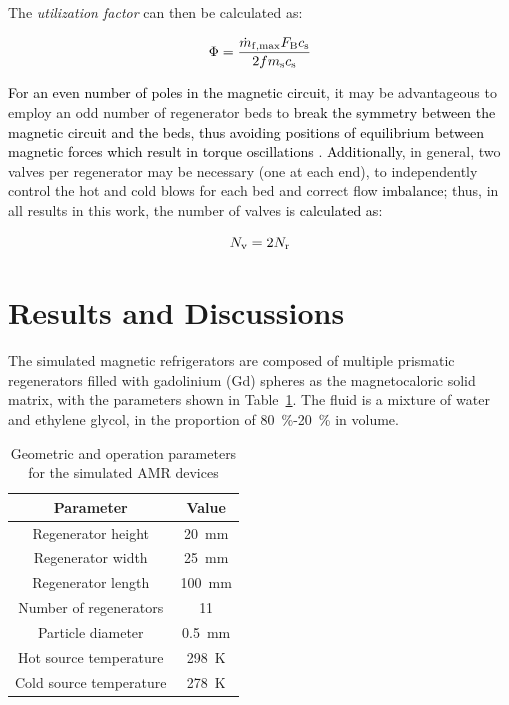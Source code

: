 \documentclass[draft]{svjour3}
\begin{document}
The \emph{utilization factor} can then be calculated as:

\begin{equation}
  \label{eq:110}
  \Phi = \frac{\dot{m}_{\mathrm{f,max}} F_{\mathrm{B}} c_{\mathrm{s}}}{2 f m_{\mathrm{s}} c_{\mathrm{s}}}
\end{equation}


\textcolor{black}{For an even number of poles in the magnetic circuit}, it may be advantageous to employ an odd number of regenerator beds to  \textcolor{black}{break the symmetry between the magnetic circuit and the beds, thus avoiding positions of equilibrium between magnetic forces which result in torque oscillations} \cite{bib:eriksen}. \textcolor{black}{Additionally}, in general, two valves per regenerator  may be necessary (one at each end), to independently control  the hot and cold blows for each bed and correct flow \textcolor{black}{imbalance}; thus, in all results in this work, the number of valves is \textcolor{black}{calculated as}:

\begin{equation}
  \label{eq:111}
  N_{\mathrm{v}} = 2 N_{\mathrm{r}}
\end{equation}



\section{Results and Discussions}
\label{sec:results-discussions}


The simulated magnetic refrigerators are composed of multiple prismatic regenerators filled with gadolinium (Gd) spheres as the magnetocaloric solid matrix, with the parameters shown in Table~\ref{tab:params}. The fluid is a mixture of water and ethylene glycol, in the proportion of \SI{80}{\percent}-\SI{20}{\percent} in volume.

\begin{table}[!ht]
  \centering
  \caption{Geometric and operation parameters for the simulated AMR devices}
  \begin{tabular}{c|c}
\hline
    \textbf{Parameter}&\textbf{Value}\\
\hline
Regenerator height & \SI{20}{\mm}\\
Regenerator width & \SI{25}{\mm}\\
Regenerator length & \SI{100}{\mm}\\
Number of regenerators & \num{11} \\
Particle diameter & \SI{0.5}{\mm}\\
Hot source temperature & \SI{298}{\kelvin}\\
Cold source temperature & \SI{278}{\kelvin}\\
\hline
  \end{tabular}
  \label{tab:params}
\end{table}
\end{document}
